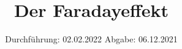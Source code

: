 

\subject{V46}
\title{Der Faradayeffekt}
\date{%
  Durchführung: 02.02.2022
  \hspace{3em}
  Abgabe: 06.12.2021
}



\maketitle
\thispagestyle{empty}
\tableofcontents
\newpage







\printbibliography{}


